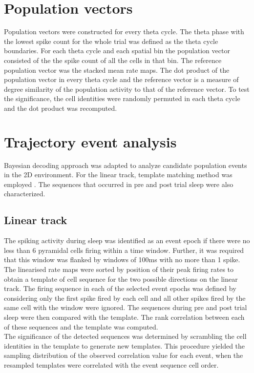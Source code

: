 \section{Population vectors}
Population vectors were constructed for every theta cycle. The theta phase with the lowest spike count for the whole trial was defined as the theta cycle boundaries. For each theta cycle and each spatial bin the population vector consisted of the the spike count of all the cells in that bin. The reference population vector was the stacked mean rate maps. The dot product of the population vector in every theta cycle and the reference vector is a measure of degree similarity of the population activity to that of the reference vector. To test the significance, the cell identities were randomly permuted in each theta cycle and the dot product was recomputed. 


\section{Trajectory event analysis}
Bayesian decoding approach was adapted to analyze candidate population events in the 2D environment. For the linear track, template matching method was employed \cite{Dragoi2013a}. The sequences that occurred in pre and post trial sleep were also characterized. 
\subsection{Linear track}
The spiking activity during sleep was identified as an event epoch if there were no less than 6 pyramidal cells firing within a time window. Further, it was required that this window was flanked by windows of 100ms with no more than 1 spike. The linearised rate maps were sorted by position of their peak firing rates to obtain a template of cell sequence for the two possible directions on the linear track. The firing sequence in each of the selected event epochs was defined by considering only the first spike fired by each cell and all other spikes fired by the same cell with the window were ignored. The sequences during pre and post trial sleep were then compared with the template. The rank correlation between each of these sequences and the template was computed. \\ 
The significance of the detected sequences was determined by scrambling the cell identities in the template to generate new templates. This procedure yielded the sampling distribution of the observed correlation value for each event, when the resampled templates were correlated with the event sequence cell order.\\
\newpage
